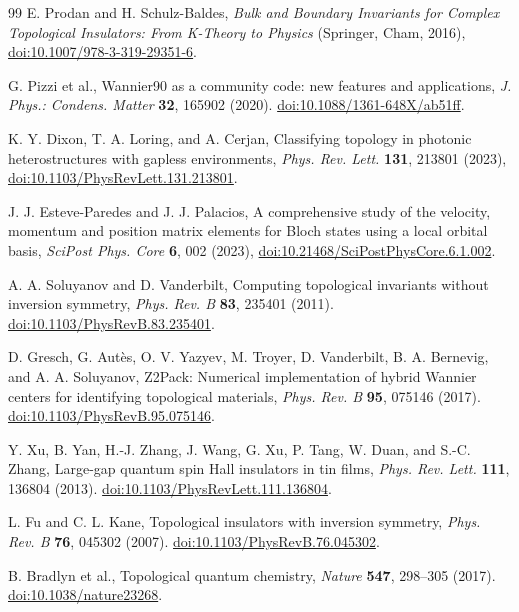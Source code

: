 \begin{thebibliography}{99}
E. Prodan and H. Schulz-Baldes,
\emph{Bulk and Boundary Invariants for Complex Topological Insulators:
From K-Theory to Physics} (Springer, Cham, 2016),
\href{https://doi.org/10.1007/978-3-319-29351-6}{doi:10.1007/978-3-319-29351-6}.

G. Pizzi et al., Wannier90 as a community code: new features and applications,
\emph{J. Phys.: Condens. Matter} \textbf{32}, 165902 (2020).
\href{https://doi.org/10.1088/1361-648X/ab51ff}{doi:10.1088/1361-648X/ab51ff}.

K. Y. Dixon, T. A. Loring, and A. Cerjan,
Classifying topology in photonic heterostructures with gapless environments,
\emph{Phys. Rev. Lett.} \textbf{131}, 213801 (2023),
\href{https://doi.org/10.1103/PhysRevLett.131.213801}{doi:10.1103/PhysRevLett.131.213801}.

J. J. Esteve-Paredes and J. J. Palacios,
A comprehensive study of the velocity, momentum and position matrix elements
for Bloch states using a local orbital basis,
\emph{SciPost Phys. Core} \textbf{6}, 002 (2023),
\href{https://doi.org/10.21468/SciPostPhysCore.6.1.002}{doi:10.21468/SciPostPhysCore.6.1.002}.

A. A. Soluyanov and D. Vanderbilt, Computing topological invariants without
inversion symmetry, \emph{Phys. Rev. B} \textbf{83}, 235401 (2011).
\href{https://doi.org/10.1103/PhysRevB.83.235401}{doi:10.1103/PhysRevB.83.235401}.

D. Gresch, G. Aut\`es, O. V. Yazyev, M. Troyer, D. Vanderbilt,
B. A. Bernevig, and A. A. Soluyanov, Z2Pack: Numerical implementation of
hybrid Wannier centers for identifying topological materials,
\emph{Phys. Rev. B} \textbf{95}, 075146 (2017).
\href{https://doi.org/10.1103/PhysRevB.95.075146}{doi:10.1103/PhysRevB.95.075146}.

Y. Xu, B. Yan, H.-J. Zhang, J. Wang, G. Xu, P. Tang, W. Duan, and S.-C. Zhang,
Large-gap quantum spin Hall insulators in tin films,
\emph{Phys. Rev. Lett.} \textbf{111}, 136804 (2013).
\href{https://doi.org/10.1103/PhysRevLett.111.136804}{doi:10.1103/PhysRevLett.111.136804}.

L. Fu and C. L. Kane, Topological insulators with inversion symmetry,
\emph{Phys. Rev. B} \textbf{76}, 045302 (2007).
\href{https://doi.org/10.1103/PhysRevB.76.045302}{doi:10.1103/PhysRevB.76.045302}.

B. Bradlyn et al., Topological quantum chemistry,
\emph{Nature} \textbf{547}, 298--305 (2017).
\href{https://doi.org/10.1038/nature23268}{doi:10.1038/nature23268}.


\end{thebibliography}
